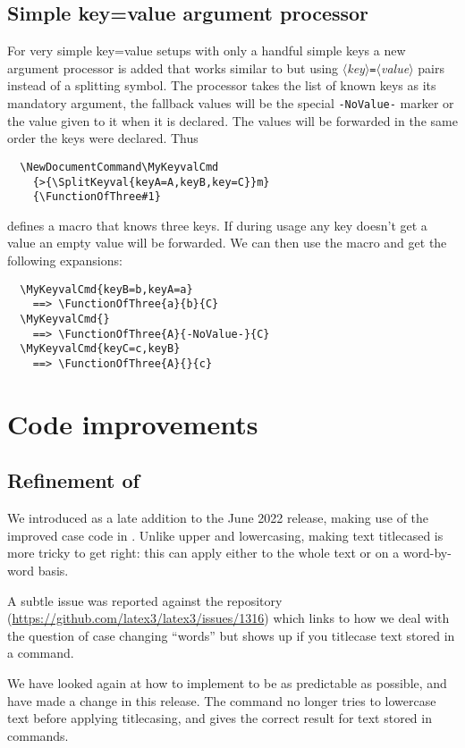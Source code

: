 \documentclass{ltnews}
\providecommand\meta[1]{$\langle$\textrm{\itshape#1}$\rangle$}
\begin{document}
\subsection{Simple key=value argument processor}

For very simple key=value setups with only a handful simple keys a new argument
processor  is added that works similar to  but
using \meta{key}\verb|=|\meta{value} pairs instead of a splitting symbol. The
processor takes the list of known keys as its mandatory argument, the fallback
values will be the special \verb|-NoValue-| marker or the value given to it when
it is declared. The values will be forwarded in the same order the keys were
declared. Thus
\begin{verbatim}
  \NewDocumentCommand\MyKeyvalCmd
    {>{\SplitKeyval{keyA=A,keyB,key=C}}m}
    {\FunctionOfThree#1}
\end{verbatim}
defines a macro that knows three keys. If during usage any key doesn't get a
value an empty value will be forwarded. We can then use the macro and get the
following expansions:
\begin{verbatim}
  \MyKeyvalCmd{keyB=b,keyA=a}
    ==> \FunctionOfThree{a}{b}{C}
  \MyKeyvalCmd{}
    ==> \FunctionOfThree{A}{-NoValue-}{C}
  \MyKeyvalCmd{keyC=c,keyB}
    ==> \FunctionOfThree{A}{}{c}
\end{verbatim}

\section{Code improvements}

\subsection{Refinement of }

We introduced  as a late addition to the June 2022
release, making use of the improved case code in . Unlike
upper and lowercasing, making text titlecased is more tricky to get
right: this can apply either to the whole text or on a word-by-word
basis.

A subtle issue was reported against the  repository
(\url{https://github.com/latex3/latex3/issues/1316}) which links to
how we deal with the question of case changing \enquote{words} but
shows up if you titlecase text stored in a command.

We have looked again at how to implement  to be as
predictable as possible, and have made a change in this release. The
command no longer tries to lowercase text before applying titlecasing,
and gives the correct result for text stored in commands.
\end{document}

